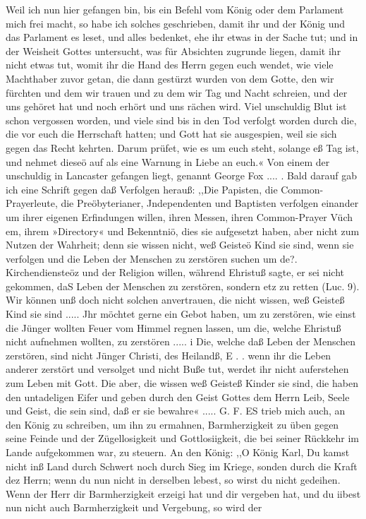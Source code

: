 Weil ich nun hier gefangen bin, bis ein Befehl vom König
oder dem Parlament mich frei macht, so habe ich solches geschrieben, 
damit ihr und der König und das Parlament es
leset, und alles bedenket, ehe ihr etwas in der Sache tut; und
in der Weisheit Gottes untersucht, was für Absichten zugrunde 
liegen, damit ihr nicht etwas tut, womit ihr die Hand
des Herrn gegen euch wendet, wie viele Machthaber zuvor getan,
die dann gestürzt wurden von dem Gotte, den wir fürchten und
dem wir trauen und zu dem wir Tag und Nacht schreien, und
der uns gehöret hat und noch erhört und uns rächen wird. Viel
unschuldig Blut ist schon vergossen worden, und viele sind bis in
den Tod verfolgt worden durch die, die vor euch die Herrschaft
hatten; und Gott hat sie ausgespien, weil sie sich gegen das
Recht kehrten. Darum prüfet, wie es um euch steht, solange eß
Tag ist, und nehmet dieseö auf als eine Warnung in Liebe
an euch.«
Von einem der unschuldig in Lancaster gefangen liegt, genannt
George Fox .... .
Bald darauf gab ich eine Schrift gegen daß Verfolgen herauß:
,,Die Papisten, die Common-Prayerleute, die Preöbyterianer,
Jndependenten und Baptisten verfolgen einander um ihrer eigenen
Erfindungen willen, ihren Messen, ihren Common-Prayer Vüch em,
ihrem »Directory« und Bekenntniö, dies sie aufgesetzt haben,
aber nicht zum Nutzen der Wahrheit; denn sie wissen nicht, weß
Geisteö Kind sie sind, wenn sie verfolgen und die Leben der Menschen
zu zerstören suchen um de?. Kirchendiensteöz und der Religion
willen, während Ehristuß sagte, er sei nicht gekommen, daS
Leben der Menschen zu zerstören, sondern etz zu retten (Luc. 9).
Wir können unß doch nicht solchen anvertrauen, die nicht wissen,
weß Geisteß Kind sie sind ..... Jhr möchtet gerne ein Gebot
haben, um zu zerstören, wie einst die Jünger wollten Feuer vom
Himmel regnen lassen, um die, welche Ehristuß nicht aufnehmen
wollten, zu zerstören ..... i Die, welche daß Leben der Menschen
zerstören, sind nicht Jünger Christi, des Heilandß, E . . wenn ihr
die Leben anderer zerstört und versolget und nicht Buße tut, werdet
ihr nicht auferstehen zum Leben mit Gott. Die aber, die wissen
weß Geisteß Kinder sie sind, die haben den untadeligen Eifer und
geben durch den Geist Gottes dem Herrn Leib, Seele und Geist,
die sein sind, daß er sie bewahre« ..... G. F.
ES trieb mich auch, an den König zu schreiben, um ihn zu
ermahnen, Barmherzigkeit zu üben gegen seine Feinde und der
Zügellosigkeit und Gottlosiigkeit, die bei seiner Rückkehr im Lande
aufgekommen war, zu steuern.
An den König:
,,O König Karl,
Du kamst nicht inß Land durch Schwert noch durch Sieg im
Kriege, sonden durch die Kraft dez Herrn; wenn du nun nicht
in derselben lebest, so wirst du nicht gedeihen. Wenn der Herr
dir Barmherzigkeit erzeigi hat und dir vergeben hat, und du
iibest nun nicht auch Barmherzigkeit und Vergebung, so wird der


